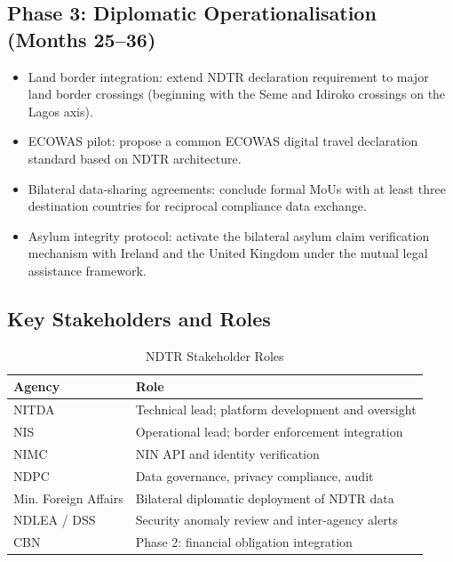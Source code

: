 \documentclass[11pt]{article}
\begin{document}
\subsection{Phase 3: Diplomatic Operationalisation (Months 25--36)}

\begin{itemize}
  \item Land border integration: extend NDTR declaration requirement
  to major land border crossings (beginning with the Seme and
  Idiroko crossings on the Lagos axis).
  \item ECOWAS pilot: propose a common ECOWAS digital travel
  declaration standard based on NDTR architecture.
  \item Bilateral data-sharing agreements: conclude formal MoUs
  with at least three destination countries for reciprocal
  compliance data exchange.
  \item Asylum integrity protocol: activate the bilateral asylum
  claim verification mechanism with Ireland and the United Kingdom
  under the mutual legal assistance framework.
\end{itemize}

\subsection{Key Stakeholders and Roles}

\begin{table}[ht]
\caption{NDTR Stakeholder Roles}
\label{tab:stakeholders}
\small
\begin{tabularx}{\columnwidth}{@{}lX@{}}
\toprule
\textbf{Agency} & \textbf{Role} \\
\midrule
NITDA           & Technical lead; platform development and oversight \\
NIS             & Operational lead; border enforcement integration \\
NIMC            & NIN API and identity verification \\
NDPC            & Data governance, privacy compliance, audit \\
Min. Foreign Affairs & Bilateral diplomatic deployment of NDTR data \\
NDLEA / DSS     & Security anomaly review and inter-agency alerts \\
CBN             & Phase 2: financial obligation integration \\
\bottomrule
\end{tabularx}
\end{table}
\end{document}

